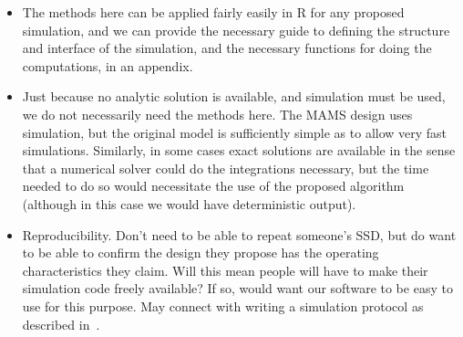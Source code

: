 \documentclass{article} %
\begin{document}
\begin{itemize}
\item The methods here can be applied fairly easily in R for any proposed simulation, and we can provide the necessary guide to defining the structure and interface of the simulation, and the necessary functions for doing the computations, in an appendix.
\item Just because no analytic solution is available, and simulation must be used, we do not necessarily need the methods here. The MAMS design uses simulation, but the original model is sufficiently simple as to allow very fast simulations. Similarly, in some cases exact solutions are available in the sense that a numerical solver could do the integrations necessary, but the time needed to do so would necessitate the use of the proposed algorithm (although in this case we would have deterministic output).
\item Reproducibility. Don't need to be able to repeat someone's SSD, but do want to be able to confirm the design they propose has the operating characteristics they claim. Will this mean people will have to make their simulation code freely available? If so, would want our software to be easy to use for this purpose. May connect with writing a simulation protocol as described in~\cite{Smith2010}.


\end{itemize}
\end{document}
